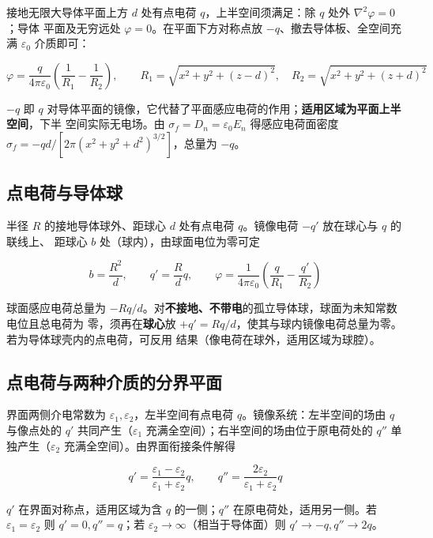 接地无限大导体平面上方 $d$ 处有点电荷 $q$，上半空间须满足：除 $q$ 处外 $\nabla^2\varphi=0$；导体
平面及无穷远处 $\varphi=0$。在平面下方对称点放 $-q$、撤去导体板、全空间充满 $\varepsilon_0$ 介质即可：
\begin{formulaBox}
\[
\varphi=\frac{q}{4\pi\varepsilon_0}\left(\frac{1}{R_1}-\frac{1}{R_2}\right),
\qquad
R_1=\sqrt{x^2+y^2+(z-d)^2},\quad R_2=\sqrt{x^2+y^2+(z+d)^2}
\]
\end{formulaBox}

$-q$ 即 $q$ 对导体平面的镜像，它代替了平面感应电荷的作用；\textbf{适用区域为平面上半空间}，下半
空间实际无电场。由 $\sigma_f=D_n=\varepsilon_0E_n$ 得感应电荷面密度
$\sigma_f=-qd/\left[2\pi(x^2+y^2+d^2)^{3/2}\right]$，总量为 $-q$。

\subsection{点电荷与导体球}

半径 $R$ 的接地导体球外、距球心 $d$ 处有点电荷 $q$。镜像电荷 $-q'$ 放在球心与 $q$ 的联线上、
距球心 $b$ 处（球内），由球面电位为零可定
\begin{formulaBox}
\[
b=\frac{R^2}{d},
\qquad
q'=\frac{R}{d}q,
\qquad
\varphi=\frac{1}{4\pi\varepsilon_0}\left(\frac{q}{R_1}-\frac{q'}{R_2}\right)
\]
\end{formulaBox}

球面感应电荷总量为 $-Rq/d$。对\textbf{不接地、不带电}的孤立导体球，球面为未知常数电位且总电荷为
零，须再在\textbf{球心}放 $+q'=Rq/d$，使其与球内镜像电荷总量为零。若为导体球壳内的点电荷，可反用
结果（像电荷在球外，适用区域为球腔）。

\subsection{点电荷与两种介质的分界平面}

界面两侧介电常数为 $\varepsilon_1,\varepsilon_2$，左半空间有点电荷 $q$。镜像系统：左半空间的场由
$q$ 与像点处的 $q'$ 共同产生（$\varepsilon_1$ 充满全空间）；右半空间的场由位于原电荷处的 $q''$
单独产生（$\varepsilon_2$ 充满全空间）。由界面衔接条件解得
\begin{formulaBox}
\[
q'=\frac{\varepsilon_1-\varepsilon_2}{\varepsilon_1+\varepsilon_2}q,
\qquad
q''=\frac{2\varepsilon_2}{\varepsilon_1+\varepsilon_2}q
\]
\end{formulaBox}

$q'$ 在界面对称点，适用区域为含 $q$ 的一侧；$q''$ 在原电荷处，适用另一侧。若
$\varepsilon_1=\varepsilon_2$ 则 $q'=0,q''=q$；若 $\varepsilon_2\to\infty$（相当于导体面）则
$q'\to-q,q''\to2q$。

